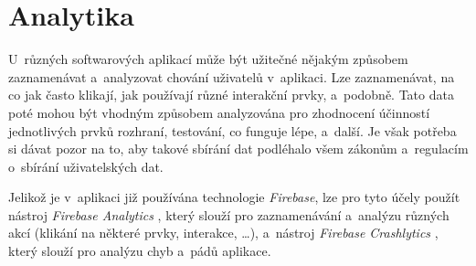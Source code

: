 \section{Analytika}

U~různých softwarových aplikací může být užitečné nějakým způsobem zaznamenávat a~analyzovat chování uživatelů v~aplikaci. Lze zaznamenávat, na co jak často klikají, jak používají různé interakční prvky, a~podobně. Tato data poté mohou být vhodným způsobem analyzována pro zhodnocení účinností jednotlivých prvků rozhraní, testování, co funguje lépe, a~další. Je však potřeba si dávat pozor na to, aby takové sbírání dat podléhalo všem zákonům a~regulacím o~sbírání uživatelských dat. 

Jelikož je v~aplikaci již používána technologie \emph{Firebase}, lze pro tyto účely použít nástroj \emph{Firebase Analytics} \cite{firebase-analytics}, který slouží pro zaznamenávání a~analýzu různých akcí (klikání na některé prvky, interakce, \dots), a~nástroj \emph{Firebase Crashlytics} \cite{firebase-crashlytics}, který slouží pro analýzu chyb a~pádů aplikace.







































